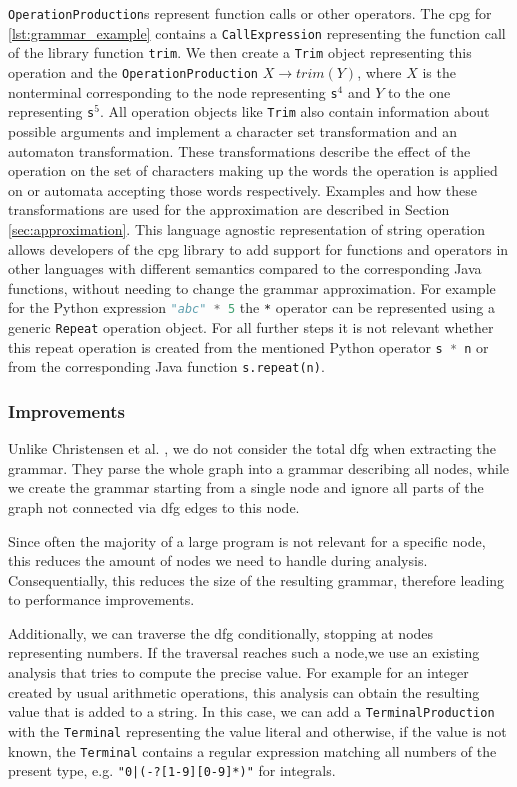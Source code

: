 \lstinline|OperationProduction|s represent function calls or other operators. The \ac{cpg} for \ref{lst:grammar_example} contains a \lstinline|CallExpression| representing the function call of the library function \lstinline|trim|. We then create a \lstinline|Trim| object representing this operation and the \lstinline|OperationProduction| $X \rightarrow trim(Y)$, where $X$ is the nonterminal corresponding to the node representing \lstinline|s|$^4$ and $Y$ to the one representing \lstinline|s|$^5$. 
All operation objects like \lstinline|Trim| also contain information about possible arguments and implement a character set transformation and an automaton transformation. These transformations describe the effect of the operation on the set of characters making up the words the operation is applied on or automata accepting those words respectively.
Examples and how these transformations are used for the approximation are described in Section \ref{sec:approximation}.
This language agnostic representation of string operation allows developers of the \ac{cpg} library to add support for functions and operators in other languages with different semantics compared to the corresponding Java functions, without needing to change the grammar approximation. For example for the Python expression \lstinline[language=Python]|"abc" * 5| the \lstinline|*| operator can be represented using a generic \lstinline|Repeat| operation object. For all further steps it is not relevant whether this repeat operation is created from the mentioned Python operator \lstinline[language=Python]|s * n| or from the corresponding Java function \lstinline|s.repeat(n)|. 


\subsubsection{Improvements}

Unlike Christensen et al. \cite{brics}, we do not consider the total \ac{dfg} when extracting the grammar. They parse the whole graph into a grammar describing all nodes, while we create the grammar starting from a single node and ignore all parts of the graph not connected via \ac{dfg} edges to this node.

Since often the majority of a large program is not relevant for a specific node, this reduces the amount of nodes we need to handle during analysis. Consequentially, this reduces the size of the resulting grammar, therefore leading to performance improvements.

Additionally, we can traverse the \ac{dfg} conditionally, stopping at nodes representing numbers. If the traversal reaches such a node,we use an existing analysis that tries to compute the precise value.
For example for an integer created by usual arithmetic operations, this analysis can obtain the resulting value that is added to a string.
In this case, we can add a \lstinline|TerminalProduction| with the \lstinline|Terminal| representing the value literal and otherwise, if the value is not known, the \lstinline|Terminal| contains a regular expression matching all numbers of the present type, e.g. \lstinline{"0|(-?[1-9][0-9]*)"} for integrals.
	

